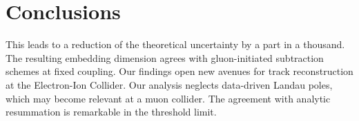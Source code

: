 \section{Conclusions}\label{sec:conclusions}

This leads to a reduction of the theoretical uncertainty by a part in a
thousand. The resulting embedding dimension agrees with gluon-initiated
subtraction schemes at fixed coupling. Our findings open new avenues for
track reconstruction at the Electron-Ion Collider. Our analysis neglects
data-driven Landau poles, which may become relevant at a muon collider.
The agreement with analytic resummation is remarkable in the threshold
limit.

